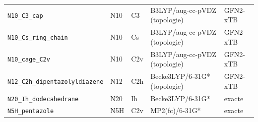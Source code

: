 \begin{longtable}{@{}p{4.4cm}p{1.3cm}p{1.2cm}p{4.1cm}p{1.9cm}@{}}
\texttt{N10\_C3\_cap} & N10 & C3 & B3LYP/aug-cc-pVDZ (topologie) & GFN2-xTB \\
\texttt{N10\_Cs\_ring\_chain} & N10 & Cs & B3LYP/aug-cc-pVDZ (topologie) & GFN2-xTB \\
\texttt{N10\_cage\_C2v} & N10 & C2v & B3LYP/aug-cc-pVDZ (topologie) & GFN2-xTB \\
\texttt{N12\_C2h\_dipentazolyldiazene} & N12 & C2h & Becke3LYP/6-31G* (topologie) & GFN2-xTB \\
\texttt{N20\_Ih\_dodecahedrane} & N20 & Ih & Becke3LYP/6-31G* & exacte \\
\texttt{N5H\_pentazole} & N5H & C2v & MP2(fc)/6-31G* & exacte \\
\bottomrule
\end{longtable}
